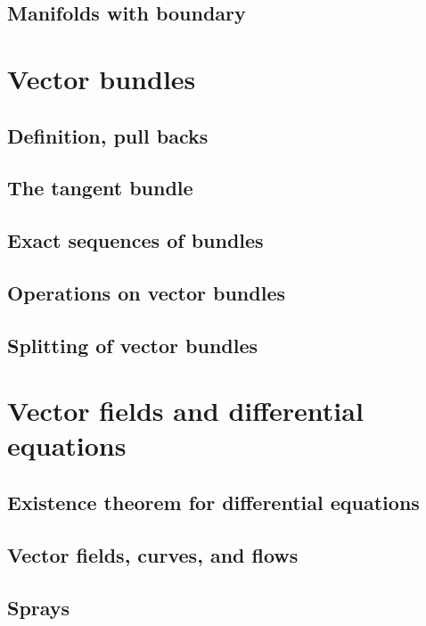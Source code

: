 \documentclass[a4paper]{article}
\begin{document}
\subsection{Manifolds with boundary}

\section{Vector bundles}

\subsection{Definition, pull backs}

\subsection{The tangent bundle}

\subsection{Exact sequences of bundles}

\subsection{Operations on vector bundles}

\subsection{Splitting of vector bundles}

\section{Vector fields and differential equations}

\subsection{Existence theorem for differential equations}

\subsection{Vector fields, curves, and flows}

\subsection{Sprays}
\end{document}
